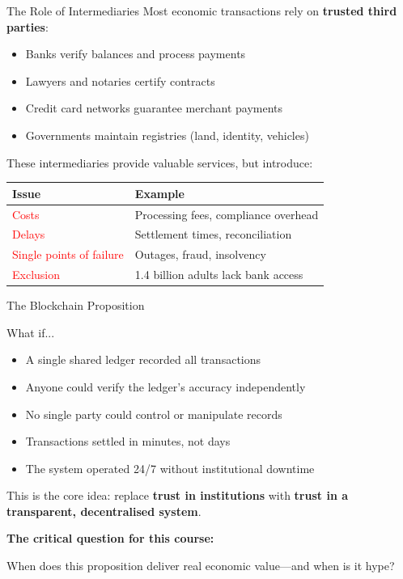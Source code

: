 \documentclass[10pt]{beamer}
\newcommand{\highlight}[1]{\textcolor{AccentOrange}{\textbf{#1}}}
\newcommand{\bad}[1]{\textcolor{red}{#1}}
\begin{document}
\begin{frame}{The Role of Intermediaries}
  Most economic transactions rely on \highlight{trusted third parties}:
  
  \vspace{0.5em}
  \begin{itemize}
    \item Banks verify balances and process payments
    \item Lawyers and notaries certify contracts
    \item Credit card networks guarantee merchant payments
    \item Governments maintain registries (land, identity, vehicles)
  \end{itemize}
  
  \vspace{1em}
  These intermediaries provide valuable services, but introduce:
  
  \vspace{0.5em}
  \begin{center}
  \begin{tabular}{ll}
    \toprule
    \textbf{Issue} & \textbf{Example} \\
    \midrule
    \bad{Costs} & Processing fees, compliance overhead \\
    \bad{Delays} & Settlement times, reconciliation \\
    \bad{Single points of failure} & Outages, fraud, insolvency \\
    \bad{Exclusion} & 1.4 billion adults lack bank access \\
    \bottomrule
  \end{tabular}
  \end{center}
\end{frame}

\begin{frame}{The Blockchain Proposition}
  \begin{block}{What if...}
    \begin{itemize}
      \item A single shared ledger recorded all transactions
      \item Anyone could verify the ledger's accuracy independently
      \item No single party could control or manipulate records
      \item Transactions settled in minutes, not days
      \item The system operated 24/7 without institutional downtime
    \end{itemize}
  \end{block}
  
  \vspace{1em}
  This is the core idea: replace \highlight{trust in institutions} with \highlight{trust in a transparent, decentralised system}.
  
  \vspace{1em}
  \textbf{The critical question for this course:}
  
  When does this proposition deliver real economic value---and when is it hype?
\end{frame}
\end{document}
